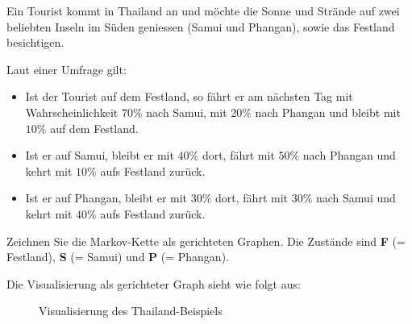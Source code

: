 \begin{myexercise}\label{ex:tourist-graph}
    Ein Tourist kommt in Thailand an und möchte die Sonne und Strände auf zwei beliebten Inseln im Süden geniessen (Samui und Phangan), sowie das Festland besichtigen.

    Laut einer Umfrage gilt:
    \begin{itemize}
        \item Ist der Tourist auf dem Festland, so fährt er am nächsten Tag mit Wahrscheinlichkeit $70\%$ nach Samui, mit $20\%$ nach Phangan und bleibt mit $10\%$ auf dem Festland.
        \item Ist er auf Samui, bleibt er mit $40\%$ dort, fährt mit $50\%$ nach Phangan und kehrt mit $10\%$ aufs Festland zurück.
        \item Ist er auf Phangan, bleibt er mit $30\%$ dort, fährt mit $30\%$ nach Samui und kehrt mit $40\%$ aufs Festland zurück.
    \end{itemize}

    Zeichnen Sie die Markov-Kette als gerichteten Graphen. Die Zustände sind \textbf{F} (= Festland), \textbf{S} (= Samui) und \textbf{P} (= Phangan).

    \begin{myanswer}
        Die Visualisierung als gerichteter Graph sieht wie folgt aus:

        \begin{figure}[H]
            \centering
            \caption{Visualisierung des Thailand-Beispiels}
            \label{fig:markov-thailand}
        \end{figure}
    \end{myanswer}
\end{myexercise}

